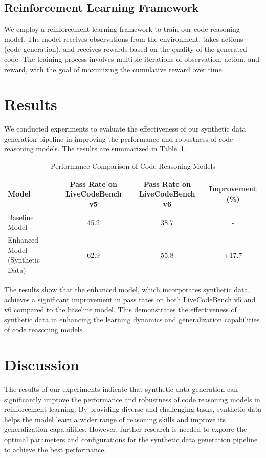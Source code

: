 \documentclass{article}
\begin{document}
\subsection{Reinforcement Learning Framework}
We employ a reinforcement learning framework to train our code reasoning model. The model receives observations from the environment, takes actions (code generation), and receives rewards based on the quality of the generated code. The training process involves multiple iterations of observation, action, and reward, with the goal of maximizing the cumulative reward over time.

\section{Results}
\label{sec:results}

We conducted experiments to evaluate the effectiveness of our synthetic data generation pipeline in improving the performance and robustness of code reasoning models. The results are summarized in Table~\ref{tab:results}.

\begin{table}[ht]
\centering
\caption{Performance Comparison of Code Reasoning Models}
\label{tab:results}
\begin{tabular}{|l|c|c|c|}
\hline
\textbf{Model} & \textbf{Pass Rate on LiveCodeBench v5} & \textbf{Pass Rate on LiveCodeBench v6} & \textbf{Improvement (\%)} \\
\hline
Baseline Model & 45.2 & 38.7 & - \\
Enhanced Model (Synthetic Data) & 62.9 & 55.8 & +17.7 \\
\hline
\end{tabular}
\end{table}

The results show that the enhanced model, which incorporates synthetic data, achieves a significant improvement in pass rates on both LiveCodeBench v5 and v6 compared to the baseline model. This demonstrates the effectiveness of synthetic data in enhancing the learning dynamics and generalization capabilities of code reasoning models.

\section{Discussion}
\label{sec:discussion}

The results of our experiments indicate that synthetic data generation can significantly improve the performance and robustness of code reasoning models in reinforcement learning. By providing diverse and challenging tasks, synthetic data helps the model learn a wider range of reasoning skills and improve its generalization capabilities. However, further research is needed to explore the optimal parameters and configurations for the synthetic data generation pipeline to achieve the best performance.
\end{document}
